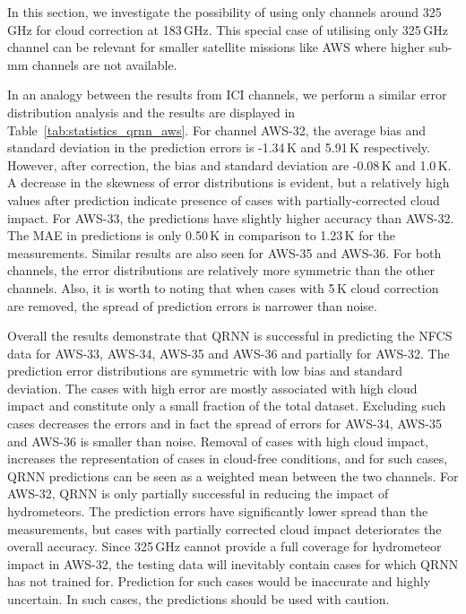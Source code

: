 \documentclass[amt, manuscript]{copernicus}
\begin{document}
In this section, we investigate the possibility of using only channels around 325\,GHz for cloud correction at 183\,GHz. This special case of utilising only 325\,GHz channel can be relevant for smaller satellite missions like AWS where higher sub-mm channels are not available. 

In an analogy between the results from ICI channels, we perform a similar error distribution analysis 
and the results are displayed in Table~\ref{tab:statistics_qrnn_aws}. For channel AWS-32, the average bias and standard deviation in the prediction errors is -1.34\,K and 5.91\,K respectively. However, after correction, the bias and standard deviation are -0.08\,K and 1.0\,K. A decrease in the skewness of error distributions is evident, but a relatively high values after prediction indicate presence of cases with partially-corrected cloud impact. For AWS-33, the predictions have slightly higher accuracy than AWS-32. The MAE in predictions is only 0.50\,K in comparison to 1.23\,K for the measurements. Similar results are also seen for AWS-35 and AWS-36. For both channels, the error distributions are relatively more symmetric than the other channels. Also, it is worth to noting that when cases with 5\,K cloud correction are removed, the spread of prediction errors is narrower than noise. 

Overall the results demonstrate that QRNN is successful in predicting the NFCS data for AWS-33, AWS-34, AWS-35 and AWS-36 and partially for AWS-32. The prediction error distributions are symmetric with low bias and standard deviation. The cases with high error are mostly associated with high cloud impact and constitute only a small fraction of the total dataset. Excluding such cases decreases the errors and in fact the spread of errors for AWS-34, AWS-35 and AWS-36 is smaller than noise. Removal of cases with high cloud impact, increases the representation of cases in cloud-free conditions, and for such cases, QRNN predictions can be seen as a weighted mean between the two channels. For AWS-32, QRNN is only partially successful in reducing the impact of hydrometeors. The prediction errors have significantly lower spread than the measurements, but cases with partially corrected cloud impact deteriorates the overall accuracy. Since 325\,GHz cannot provide a full coverage for hydrometeor impact in AWS-32, the testing data will inevitably contain cases for which QRNN has not trained for. Prediction for such cases would be inaccurate and highly uncertain. In such cases, the predictions should be used with caution. 
\end{document}
